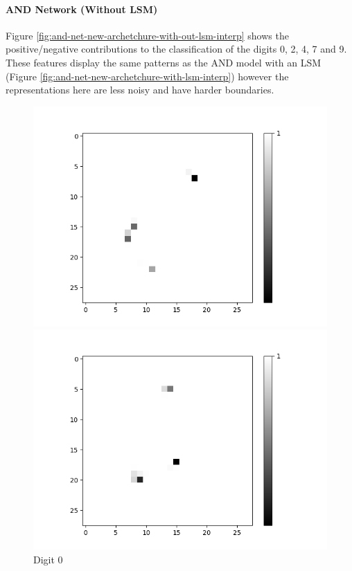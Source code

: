 \paragraph{AND Network (Without LSM)}
Figure \ref{fig:and-net-new-archetchure-with-out-lsm-interp} shows the positive/negative contributions to the classification of the digits 0, 2, 4, 7 and 9. These features display the same patterns as the AND model with an LSM (Figure \ref{fig:and-net-new-archetchure-with-lsm-interp}) however the representations here are less noisy and have harder boundaries.

\begin{figure}[H]
	\centering
	\begin{minipage}[b]{0.19\textwidth}
		\captionsetup{labelformat=empty}
		\includegraphics[width=\textwidth]{AND(NO-LSM)/Positive/Layer0-Neuron-0.png}
		\caption{Digit 0}
	\end{minipage}
	\begin{minipage}[b]{0.19\textwidth}
		\captionsetup{labelformat=empty}
		\includegraphics[width=\textwidth]{AND(NO-LSM)/Positive/Layer0-Neuron-2.png}

\end{minipage}
\end{figure}
